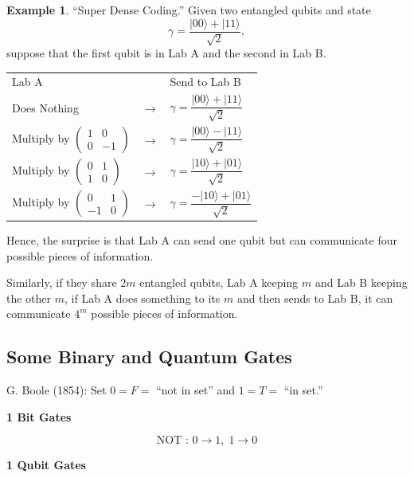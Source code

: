 \documentclass[12pt]{article}
\theoremstyle{definition}
\newtheorem*{example}{Example}
\newcommand{\ket}[1]{|#1\rangle}
\begin{document}
\begin{example}
``Super Dense Coding.'' Given two entangled qubits and state
\[
\gamma = \frac{\ket{00}+\ket{11}}{\sqrt{2}},
\]
suppose that the first qubit is in Lab A and the second in Lab B.
\end{example}

\begin{center}
\begin{tabular}{lcl}
Lab A & & Send to Lab B \\
Does Nothing & $\to$ & $\gamma = \dfrac{\ket{00}+\ket{11}}{\sqrt{2}}$ \\[1em]
Multiply by $\begin{pmatrix}1&0\\0&-1\end{pmatrix}$ & $\to$ & $\gamma = \dfrac{\ket{00}-\ket{11}}{\sqrt{2}}$ \\[1em]
Multiply by $\begin{pmatrix}0&1\\1&0\end{pmatrix}$ & $\to$ & $\gamma = \dfrac{\ket{10}+\ket{01}}{\sqrt{2}}$ \\[1em]
Multiply by $\begin{pmatrix}0&1\\-1&0\end{pmatrix}$ & $\to$ & $\gamma = \dfrac{-\ket{10}+\ket{01}}{\sqrt{2}}$
\end{tabular}
\end{center}

Hence, the surprise is that Lab A can send one qubit but can communicate four possible pieces of information.

Similarly, if they share $2m$ entangled qubits, Lab A keeping $m$ and Lab B keeping the other $m$, if Lab A does something to its $m$ and then sends to Lab B, it can communicate $4^m$ possible pieces of information.

\subsection{Some Binary and Quantum Gates}

G. Boole (1854): Set $0 = F =$ ``not in set'' and $1 = T =$ ``in set.''

\begin{center}
\textbf{1 Bit Gates}
\end{center}

\[
\text{NOT : } 0 \to 1,\; 1 \to 0
\]

\begin{center}
\textbf{1 Qubit Gates}
\end{center}
\end{document}
